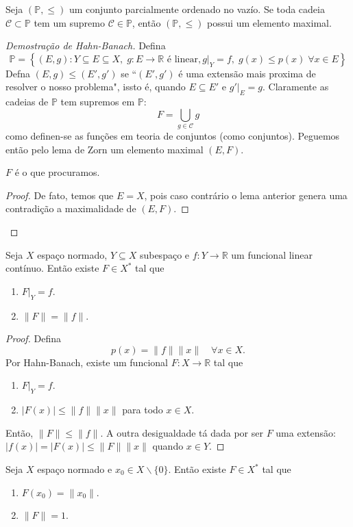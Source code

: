 \documentclass[portuguese]{article}
\theoremstyle{definition}
\newcommand{\R}{\mathbb{R}}
\begin{document}
	\begin{lema}[de Zorn]
		Seja $(\mathbb{P},\leq)$ um conjunto parcialmente ordenado no vazío. Se toda cadeia $\mathcal{C}\subset\mathbb{P}$ tem um supremo $\mathcal{C}\in\mathbb{P}$, então $(\mathbb{P},\leq)$ possui um elemento maximal.
	\end{lema}
	\begin{proof}[Demostração de Hahn-Banach]
		Defina
		\[\mathbb{P}=\left\{(E,g):Y\subseteq E\subseteq X,\;
		g:E\to\R\text{ é linear},
		g|_Y=f,\;
		g(x)\leq p(x)\;\forall x\in E\right\}\]
		Defna $(E,g)\leq(E',g')$ se ``$(E',g')$ é uma extensão mais proxima de resolver o nosso problema", issto é, quando $E\subseteq E'$ e $g'|_E=g$. Claramente as cadeias de $\mathbb{P}$ tem supremos em $\mathbb{P}$:
		\[F=\bigcup_{g\in\mathcal{C}}g\]
		como definen-se as funções em teoria de conjuntos (como conjuntos). Peguemos então pelo lema de Zorn um elemento maximal $(E,F)$.
		\begin{af*}
			$F$ é o que procuramos.
		\end{af*}
		\begin{proof}
			De fato, temos que $E=X$, pois caso contrário o lema anterior genera uma contradição a maximalidade de $(E,F)$.
		\end{proof}
	\end{proof}
	\begin{coro}
		Seja $X$ espaço normado, $Y\subseteq X$ subespaço e $f:Y\to\R$ um funcional linear contínuo. Então existe $F\in X^*$ tal que
		\begin{enumerate}
			\item $F|_Y=f$.
			\item $\| F\|=\| f\|$.
		\end{enumerate}
	\end{coro}
	\begin{proof}
		Defina
		\[p(x)=\| f\|\| x\|\quad\forall x\in X.\]
		Por Hahn-Banach, existe um funcional $F:X\to\R$ tal que
		\begin{enumerate}
			\item $F|_Y=f$.
			\item $|F(x)|\leq\| f\|\| x\|$ para todo $x\in X$.
		\end{enumerate}
		Então, $\| F\|\leq\| f\|$. A outra desigualdade tá dada por ser $F$ uma extensão: $|f(x)|=|F(x)|\leq\| F\|\| x\|$ quando $x\in Y$.
	\end{proof}
	\begin{coro}
		Seja $X$ espaço normado e $x_0\in X\backslash\{0\}$. Então existe $F\in X^*$ tal que
		\begin{enumerate}
			\item $F(x_0)=\| x_0\|$.
			\item $\| F\| =1$.
		\end{enumerate}
	\end{coro}
\end{document}
